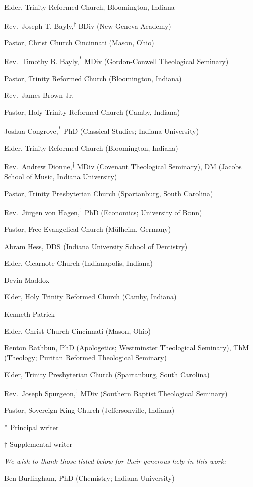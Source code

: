 \documentclass[
]{book}
\begin{document}
Elder, Trinity Reformed Church, Bloomington, Indiana

Rev.~Joseph T. Bayly,\textsuperscript{†} BDiv (New Geneva Academy)

Pastor, Christ Church Cincinnati (Mason, Ohio)

Rev.~Timothy B. Bayly,\textsuperscript{*} MDiv (Gordon-Conwell Theological Seminary)

Pastor, Trinity Reformed Church (Bloomington, Indiana)

Rev.~James Brown Jr.

Pastor, Holy Trinity Reformed Church (Camby, Indiana)

Joshua Congrove,\textsuperscript{*} PhD (Classical Studies; Indiana University)

Elder, Trinity Reformed Church (Bloomington, Indiana)

Rev.~Andrew Dionne,\textsuperscript{†} MDiv (Covenant Theological Seminary), DM (Jacobs School of Music, Indiana University)

Pastor, Trinity Presbyterian Church (Spartanburg, South Carolina)

Rev.~Jürgen von Hagen,\textsuperscript{†} PhD (Economics; University of Bonn)

Pastor, Free Evangelical Church (Mülheim, Germany)

Abram Hess, DDS (Indiana University School of Dentistry)

Elder, Clearnote Church (Indianapolis, Indiana)

Devin Maddox

Elder, Holy Trinity Reformed Church (Camby, Indiana)

Kenneth Patrick

Elder, Christ Church Cincinnati (Mason, Ohio)

Renton Rathbun, PhD (Apologetics; Westminster Theological Seminary), ThM (Theology; Puritan Reformed Theological Seminary)

Elder, Trinity Presbyterian Church (Spartanburg, South Carolina)

Rev.~Joseph Spurgeon,\textsuperscript{†} MDiv (Southern Baptist Theological Seminary)

Pastor, Sovereign King Church (Jeffersonville, Indiana)

* Principal writer

† Supplemental writer

\emph{We wish to thank those listed below for their generous help in this work:}

Ben Burlingham, PhD (Chemistry; Indiana University)
\end{document}
